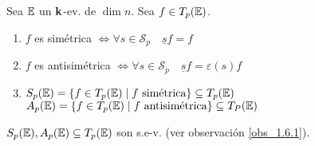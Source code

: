 \begin{defi}
    Sea $\mathbb{E}$ un $\mathbf{k}$-ev. de $\dim n$. Sea $f \in T_p(\mathbb{E})$.
    \begin{enumerate}
        \item
            $f$ es simétrica $\iff \forall s \in \mathcal{S}_p \quad \underline{s}f = f$
        
        \item
            $f$ es antisimétrica $\iff \forall s \in \mathcal{S}_p \quad \underline{s}f 
            = \varepsilon (s) f$
        
        \item
            $S_p(\mathbb{E}) = \left\{f \in T_p(\mathbb{E}) \mid f \text{ simétrica}\right\} \subseteq T_p(\mathbb{E})$\\
            $A_p(\mathbb{E}) = \left\{f \in T_p(\mathbb{E}) \mid f \text{ antisimétrica}\right\} \subseteq T_P(\mathbb{E})$
        
    \end{enumerate}
\end{defi}
\begin{obs}
    $S_p(\mathbb{E}), A_p(\mathbb{E}) \subseteq T_p(\mathbb{E})$ son s.e-v. (ver observación \ref{obs_1.6.1}).
\end{obs}
